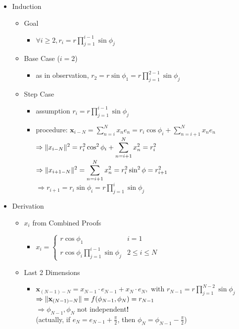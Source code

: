 \begin{itemize}
\item Induction
	\begin{itemize}
	\item Goal
		\begin{itemize}
		\item $\displaystyle \forall i \ge 2, r_i = r\prod_{j=1}^{i-1}\sin\phi_j$
		\end{itemize}
	\item Base Case ($i=2$)
		\begin{itemize}
		\item as in observation, $\displaystyle r_2 = r\sin\phi_1 = r\prod_{j=1}^{2-1}\sin\phi_j$
		\end{itemize}
	\item Step Case
		\begin{itemize}
		\item assumption $\displaystyle r_i = r\prod_{j=1}^{i-1}\sin\phi_j$
		\item procedure: $\displaystyle \mathbf x_{i-N} = \sum_{n=i}^Nx_ne_n = r_i\cos\phi_i + \sum_{n=i+1}^Nx_ne_n$ \\
			$\displaystyle \Rightarrow \lVert x_{i-N}\rVert^2 = r_i^2\cos^2\phi_i + \sum_{n=i+1}^N x_n^2 = r_i^2$ \\
			$\displaystyle \Rightarrow \lVert x_{i+1-N}\rVert^2 = \sum_{n=i+1}^Nx_n^2 = r_i^2\sin^2\phi = r_{i+1}^2$ \\
			$\displaystyle \Rightarrow r_{i+1} = r_i\sin\phi_i = r\prod_{j=1}^i\sin\phi_j$
		\end{itemize}
	\end{itemize}

\item Derivation
	\begin{itemize}
	\item $x_i$ from Combined Proofs
		\begin{itemize}
		\item $x_i = \begin{cases} r\cos\phi_1 & i = 1 \\ \displaystyle r\cos\phi_i\prod_{j=1}^{i-1}\sin\phi_j & 2\le i \le N \end{cases}$
		\end{itemize}
	\item Last 2 Dimensions
		\begin{itemize}
		\item $\displaystyle \mathbf x_{(N-1)-N} = x_{N-1}\cdot e_{N-1} + x_N\cdot e_N, \text{ with } r_{N-1} = r\prod_{j=1}^{N-2}\sin\phi_j$ \\
		$\Rightarrow \lVert\mathbf x_{(N-1)-N}\rVert = f(\phi_{N-1}, \phi_N)=r_{N-1}$ \\
		$\Rightarrow \phi_{N-1},\phi_N$ not independent\textbf{!} \\
		(actually, if $e_N = e_{N-1} + \frac \pi 2$, then $\phi_N = \phi_{N-1} - \frac \pi 2$) \\
		

\end{itemize}
\end{itemize}
\end{itemize}
